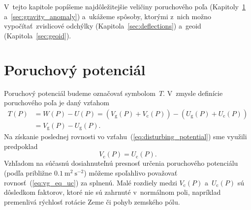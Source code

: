 \documentclass[a4paper,12pt]{book}
\newcommand{\gidx}{\mathrm g}
\newcommand{\cidx}{\mathrm c}
\begin{document}
V~tejto kapitole popíšeme najdôležitejšie veličiny poruchového poľa 
(Kapitoly~\ref{sec:disturbing_potential} a~\ref{sec:gravity_anomaly}) a~ukážeme 
spôsoby, ktorými z~nich možno vypočítať~zvislicové odchýlky 
(Kapitola~\ref{sec:deflections}) a~geoid (Kapitola~\ref{sec:geoid}).






\section{Poruchový potenciál}
\label{sec:disturbing_potential}

Poruchový potenciál budeme označovať symbolom~$T$.  V~zmysle definície 
poruchového poľa je daný vzťahom
%
\begin{equation}
\label{eq:disturbing_potential}
\begin{split}
T(P) &= W(P) - U(P) = (V_\gidx(P) + V_\cidx(P)) - (U_\gidx(P) + U_\cidx(P))\\
%
&= V_\gidx(P) - U_\gidx(P){.}
\end{split}
\end{equation}
%
Na získanie poslednej rovnosti vo vzťahu~(\ref{eq:disturbing_potential}) sme 
využili predpoklad
%
\begin{equation}
\label{eq:vg_eq_uc}
V_\cidx(P) = U_\cidx(P){.}
\end{equation}
%
Vzhľadom na súčasnú dosiahnuteľnú presnosť určenia poruchového potenciálu 
(podľa \cite{SansoGeoidDetermination} približne $0.1\ \mathrm{m}^2 
\ \mathrm{s}^{-2}$) môžeme spoľahlivo považovať rovnosť~(\ref{eq:vg_eq_uc}) za 
splnenú.  Malé rozdiely medzi $V_\cidx(P)$ a~$U_\cidx(P)$ sú dôsledkom 
faktorov, ktoré nie sú zahrnuté v~normálnom poli, napríklad premenlivá rýchlosť 
rotácie Zeme či pohyb zemského pólu.
\end{document}
